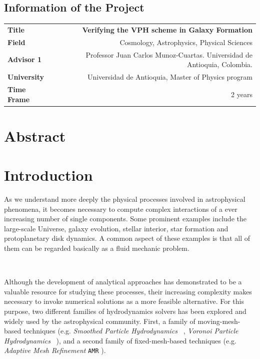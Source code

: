 \documentclass[a4,useAMS,usenatbib,usegraphicx,12pt]{article}
\begin{document}
\subsection*{Information of the Project}
\begin{tabular}{L!{\VRule}R}
\bf Title		& \bf Verifying the VPH scheme in Galaxy Formation\\
\bf Field		& Cosmology, Astrophysics, Physical Sciences \\
\bf Advisor 1	& Professor Juan Carlos Munoz-Cuartas. Universidad de Antioquia, Colombia.\\
\bf University	& Universidad de Antioquia, Master of Physics program \\
\bf Time Frame	& 2 years \\
\end{tabular}
\normalsize

\section{Abstract}
\newpage


\section{Introduction}
As we understand more deeply the physical processes involved in astrophysical 
phenomena, it becomes necessary to compute complex interactions of a ever 
increasing number of single components. Some prominent examples include 
the large-scale Universe, galaxy evolution, stellar interior, star formation 
and protoplanetary disk dynamics. A common aspect of these examples is that all 
of them can be regarded basically as a fluid mechanic problem.

\

Although the development of analytical approaches has demonstrated to be a
valuable resource for studying these processes, their increasing complexity 
makes necessary to invoke numerical solutions as a more feasible alternative. 
For this purpose, two different families of hydrodynamics solvers has been 
explored and widely used by the astrophysical community. First, a family of 
moving-mesh-based techniques (e.g. \textit{Smoothed Particle Hydrodynamics} 
\SPH\ \citep{Lucy77,Gingold77}, \textit{Voronoi Particle Hydrodynamics} \VPH\ 
\citep{Hess10}), and a second family of fixed-mesh-based techniques (e.g.
\textit{Adaptive Mesh Refinement} \texttt{AMR} \citep{Berger89}).
\end{document}
